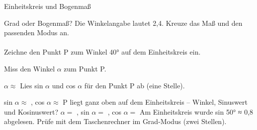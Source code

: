 \setcounter{aufgabe}{13}

\begin{aufgabe}{Einheitskreis und Bogenmaß}
\begin{teile}
\teil Grad oder Bogenmaß? Die Winkelangabe lautet 2,4. Kreuze das Maß und den passenden Modus an.\\ \\ 
\teil Zeichne den Punkt P zum Winkel 40° auf dem Einheitskreis ein.

\begin{ksys}[xmin=-1.2,xmax=1.2,ymin=-1.2,ymax=1.2,xstep=0.2,ystep=0.2]\end{ksys}
\teil Miss den Winkel $\alpha$ zum Punkt P.

$\alpha \approx$ \leerfeld[°]
\teil Lies sin $\alpha$ und cos $\alpha$ für den Punkt P ab (eine Stelle).

\begin{ksys}[xmin=-1.2,xmax=1.2,ymin=-1.2,ymax=1.2,xstep=0.2,ystep=0.2,ablesen]\end{ksys}
sin $\alpha \approx$ \leerfeld, cos $\alpha \approx$ \leerfeld
\teil P liegt ganz oben auf dem Einheitskreis – Winkel, Sinuswert und Kosinuswert? $\alpha = $ \leerfeld[°], sin $\alpha = $ \leerfeld, cos $\alpha = $ \leerfeld
\teil Am Einheitskreis wurde sin 50° ≈ 0,8 abgelesen. Prüfe mit dem Taschenrechner im Grad-Modus (zwei Stellen).


\end{teile}
\end{aufgabe}
